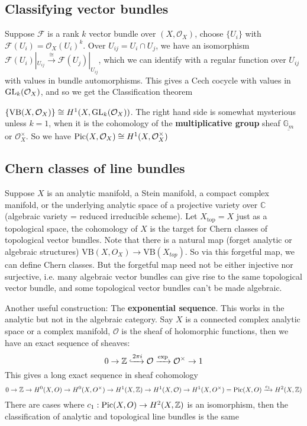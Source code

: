 \documentclass[main]{subfiles}
\begin{document}
\subsection{Classifying vector bundles}
Suppose $\mathcal F$ is a rank $k$ vector bundle over $(X,\mathcal O_X)$, choose $\{U_i\}$ with $\mathcal F(U_i)=\mathcal O_X(U_i)^k$. Over $U_{ij}=U_i\cap U_j$, we have an isomorphism
$\mathcal F(U_i)|_{U_{ij}}\xrightarrow{\cong}\mathcal F(U_j)|_{U_{ij}}$, which we can identify with a regular function over $U_{ij}$ with values in bundle automorphisms. This gives a Cech cocycle with values in $\operatorname{GL}_k(\mathcal O_X)$, and so we get the Classification theorem

\begin{theorem}
$\{\mathrm{VB}(X,\mathcal O_X)\}\cong H^1(X,\operatorname{GL}_k(\mathcal O_X))$. The right hand side is somewhat mysterious unless $k=1$, when it is the cohomology of the \textbf{multiplicative group} sheaf $\underline{\mathbb G_m}$ or $\mathcal O_X^\times$. So we have $\operatorname{Pic}(X,\mathcal O_X)\cong H^1(X,\mathcal O_X^\times)$
\end{theorem}

\subsection{Chern classes of line bundles}

Suppose $X$ is an analytic manifold, a Stein manifold, a compact complex manifold, or the underlying analytic space of a projective variety over $\mathbb C$ (algebraic variety = reduced irreducible scheme). Let $X_{\text{top}}=X$ just as a topological space, the cohomology of $X$ is the target for Chern classes of topological vector bundles. Note that there is a natural map (forget analytic or algebraic structures) $\mathrm{VB}(X,O_X)\to \mathrm{VB}(X_{top})$. So via this forgetful map, we can define Chern classes. But the forgetful map need not be either injective nor surjective, i.e. many algebraic vector bundles can give rise to the same topological vector bundle, and some topological vector bundles can't be made algebraic.

Another useful construction: The \textbf{exponential sequence}. This works in the analytic but not in the algebraic category. Say $X$ is a connected complex analytic space or a complex manifold, $\mathcal O$ is the sheaf of holomorphic functions, then we have an exact sequence of sheaves:
\[0\to \mathbb Z\xhookrightarrow{2\pi i}\mathcal O\xrightarrow{\exp}\mathcal O^\times\to1\]
This gives a long exact sequence in sheaf cohomology
\[0\to\mathbb Z\to H^0(X,O)\to H^0(X,O^\times)\to H^1(X,\mathbb Z)\to H^1(X,\mathcal O)\to H^1(X,O^\times)=\operatorname{Pic}(X,O)\xrightarrow{c_1}H^2(X,\mathbb Z)\]
There are cases where $c_1:\operatorname{Pic}(X,O)\to H^2(X,\mathbb Z)$ is an isomorphism, then the classification of analytic and topological line bundles is the same
\end{document}
